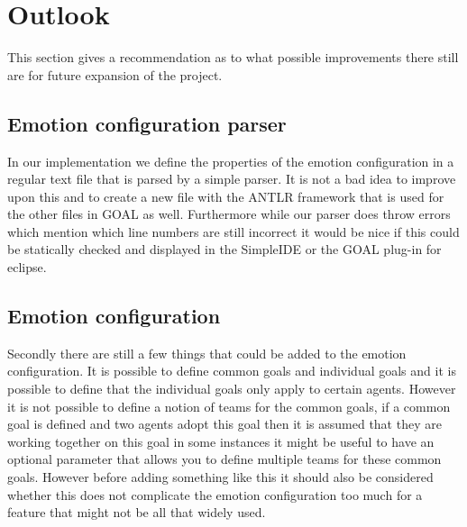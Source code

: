 \documentclass[11pt]{article}
\begin{document}
\section{Outlook}
This section gives a recommendation as to what possible improvements there still are for future expansion of the project.

\subsection{Emotion configuration parser}
In our implementation we define the properties of the emotion configuration in a regular text file that is parsed by a simple parser. It is not a bad idea to improve upon this and to create a new file with the \gls{ANTLR} framework that is used for the other files in \gls{GOAL}\cite{GOAL} as well. Furthermore while our parser does throw errors which mention which line numbers are still incorrect it would be nice if this could be statically checked and displayed in the SimpleIDE\cite{SimpleIDE} or the GOAL plug-in for eclipse.

\subsection{Emotion configuration}
Secondly there are still a few things that could be added to the emotion configuration. It is possible to define common goals and individual goals and it is possible to define that the individual goals only apply to certain agents. However it is not possible to define a notion of teams for the common goals, if a common goal is defined and two agents adopt this goal then it is assumed that they are working together on this goal in some instances it might be useful to have an optional parameter that allows you to define multiple teams for these common goals. However before adding something like this it should also be considered whether this does not complicate the emotion configuration too much for a feature that might not be all that widely used.
\end{document}
